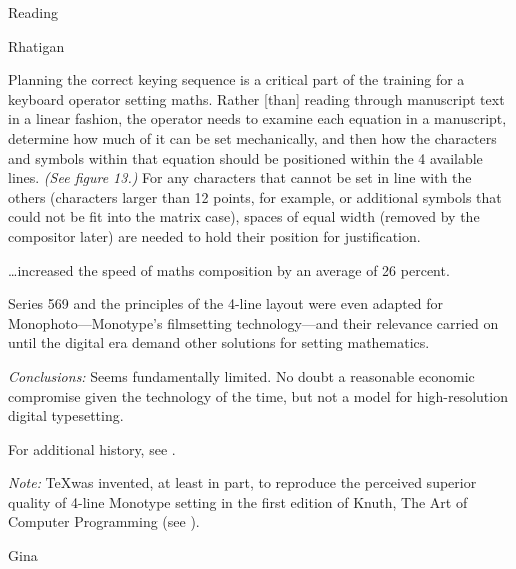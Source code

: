 \documentclass[11pt]{PalisadesLakesBook}
\begin{document}
\begin{plSection}{Reading}
\begin{plSection}{Rhatigan}
\begin{plSection}{}
\begin{plQuote}{}
{}
Planning the correct keying sequence is a critical part of the
training for a keyboard operator setting maths.
Rather [than] reading through manuscript text 
in a linear fashion,
the operator needs to examine each equation in a manuscript,
determine how much of it can be set mechanically,
and then how the characters and symbols within that equation
should be positioned within the 4 available lines. 
\textit{(See figure 13.)}
For any characters that cannot be set in line with the others
(characters larger than 12 points, for example,
or additional symbols that could not be fit into the matrix case),
spaces of equal width (removed by the compositor later)
are needed to hold their position for justification.
\end{plQuote}

\begin{plQuote}{}
{}
\ldots increased the speed of maths composition 
by an average of 26 percent.
\end{plQuote}

\begin{plQuote}{}
{}
Series 569 and the principles of the 4-line layout 
were even adapted for Monophoto---Monotype's 
filmsetting technology---and their relevance carried on 
until the digital era demand other solutions 
for setting mathematics.
\end{plQuote}

\emph{Conclusions:}
Seems fundamentally limited. 
No doubt a reasonable economic compromise given the technology of
the time, but not a model for high-resolution digital typesetting.

For additional history, see
.

\emph{Note:} \TeX was invented, at least in part, 
to reproduce the perceived superior quality 
of 4-line Monotype setting
in the first edition of Knuth, The Art of Computer Programming
(see ).

\end{plSection}%
\begin{plSection}{Gina}

\begin{plSection}{}


\end{plSection}
\end{plSection}
\end{plSection}
\end{plSection}
\end{document}
